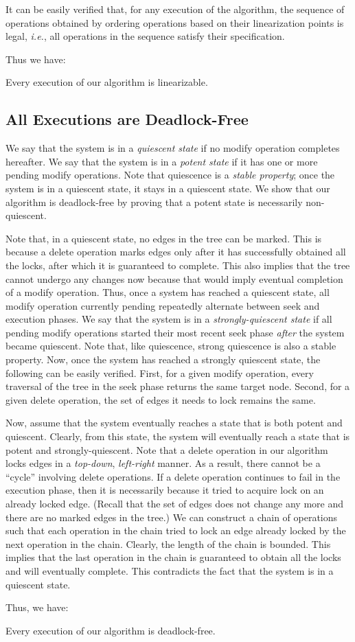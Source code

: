 It can be easily verified that, for any execution of the algorithm, the sequence of operations obtained by ordering operations based on their linearization points is legal, \emph{i.e.}, all operations in the sequence satisfy their specification. 

Thus we have:
\begin{theorem}
Every execution of our algorithm is linearizable.
\end{theorem}
			 
\subsection*{All Executions are Deadlock-Free}	
We say that the system is in a \emph{quiescent state} if no modify operation completes hereafter. We say that the system is in a \emph{potent state} if it has one or more pending modify operations. Note that quiescence is a \emph{stable property}; once the system is in a quiescent state, it stays in a quiescent state. We show that our algorithm is deadlock-free by proving that a potent state is necessarily non-quiescent. 


Note that, in a quiescent state, no edges in the tree can be marked. This is because a delete operation marks edges only after it has successfully obtained all the locks, after which it is guaranteed to complete. This also implies that the tree cannot undergo any changes now because that would imply eventual completion of a modify operation. Thus, once a system has reached a quiescent state, all modify operation currently pending repeatedly alternate between seek and execution phases. We say that the system is in a \emph{strongly-quiescent state} if all pending modify operations started their most recent seek phase \emph{after} the system became quiescent. Note that, like quiescence, strong quiescence is also a stable property. Now, once the system has reached a strongly quiescent state, the following can be easily verified. First, for a given modify operation, every traversal of the tree in the seek phase returns the same target node. Second, for a given delete operation, the set of edges it needs to lock remains the same. 


Now, assume that the system eventually reaches a state that is both potent and quiescent. Clearly, from this state, the system will eventually reach a state that is potent and strongly-quiescent. Note that a delete operation in our algorithm locks edges in a \emph{top-down}, \emph{left-right} manner. As a result, there cannot be a ``cycle'' involving delete operations. If a delete operation continues to fail in the execution phase, then it is necessarily because it tried to acquire lock on an already locked edge. (Recall that the set of edges does not change any more and there are no marked edges in the tree.) We can construct a chain of operations such that each operation in the chain tried to lock an edge already locked by the next operation in the chain. Clearly, the length of the chain is bounded. This implies that the last operation in the chain is guaranteed to obtain all the locks and will eventually complete. This contradicts the fact that the system is in a quiescent state. 


Thus, we have:
\begin{theorem}
Every execution of our algorithm is deadlock-free.
\end{theorem}
